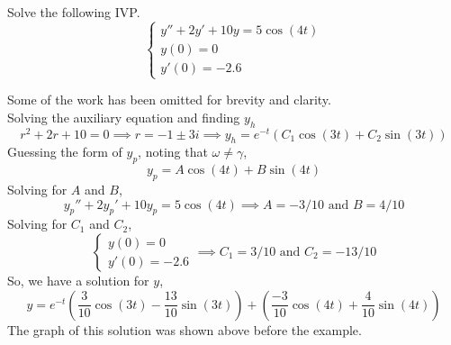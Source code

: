 \begin{example}
	Solve the following IVP.
	\begin{equation*}
		\begin{cases}
			y'' + 2y' + 10y = 5\cos{(4t)} \\
			y(0) = 0 \\
			y'(0) = -2.6
		\end{cases}
	\end{equation*}
\end{example}
\noindent
Some of the work has been omitted for brevity and clarity.\\

\noindent
Solving the auxiliary equation and finding $y_h$
\begin{equation*}
	r^2 + 2r + 10 = 0 \implies r = -1 \pm 3i \implies y_h = e^{-t}\left(C_1\cos{(3t) + C_2\sin{(3t)}}\right)
\end{equation*}
Guessing the form of $y_p$, noting that $\omega \neq \gamma$,
\begin{equation*}
	y_p = A\cos{(4t)} + B\sin{(4t)}
\end{equation*}
Solving for $A$ and $B$,
\begin{equation*}
	y_p'' + 2y_p' + 10y_p = 5\cos{(4t)} \implies A = -3/10 \text{ and } B = 4/10
\end{equation*}
Solving for $C_1$ and $C_2$,
\begin{equation*}
	\begin{cases}
		y(0) = 0 \\
		y'(0) = -2.6
	\end{cases} \implies C_1 = 3/10 \text{ and } C_2 = -13/10
\end{equation*}
So, we have a solution for $y$,
\begin{equation*}
	y = e^{-t}\left(\frac{3}{10}\cos{(3t)} - \frac{13}{10}\sin{(3t)}\right) + \left(\frac{-3}{10}\cos{(4t)} + \frac{4}{10}\sin{(4t)}\right)
\end{equation*}
The graph of this solution was shown above before the example.